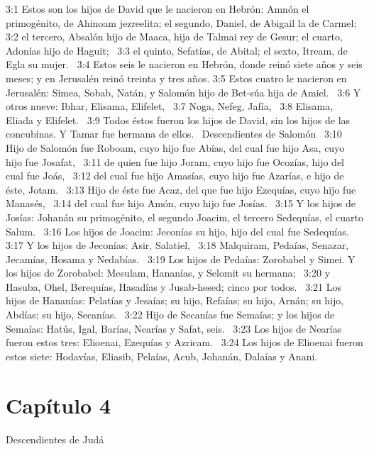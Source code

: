 3:1 Estos son los hijos de David que le nacieron en Hebrón: Amnón el primogénito, de Ahinoam jezreelita; el segundo, Daniel, de Abigail la de Carmel;  
3:2 el tercero, Absalón hijo de Maaca, hija de Talmai rey de Gesur; el cuarto, Adonías hijo de Haguit;  
3:3 el quinto, Sefatías, de Abital; el sexto, Itream, de Egla su mujer.  
3:4 Estos seis le nacieron en Hebrón, donde reinó siete años y seis meses; y en Jerusalén reinó treinta y tres años. 
3:5 Estos cuatro le nacieron en Jerusalén: Simea, Sobab, Natán, y Salomón hijo de Bet-súa hija de Amiel.  
3:6 Y otros nueve: Ibhar, Elisama, Elifelet,  
3:7 Noga, Nefeg, Jafía,  
3:8 Elisama, Eliada y Elifelet.  
3:9 Todos éstos fueron los hijos de David, sin los hijos de las concubinas. Y Tamar fue hermana de ellos.  
Descendientes de Salomón  
3:10 Hijo de Salomón fue Roboam, cuyo hijo fue Abías, del cual fue hijo Asa, cuyo hijo fue Josafat,  
3:11 de quien fue hijo Joram, cuyo hijo fue Ocozías, hijo del cual fue Joás,  
3:12 del cual fue hijo Amasías, cuyo hijo fue Azarías, e hijo de éste, Jotam.  
3:13 Hijo de éste fue Acaz, del que fue hijo Ezequías, cuyo hijo fue Manasés,  
3:14 del cual fue hijo Amón, cuyo hijo fue Josías.  
3:15 Y los hijos de Josías: Johanán su primogénito, el segundo Joacim, el tercero Sedequías, el cuarto Salum.  
3:16 Los hijos de Joacim: Jeconías su hijo, hijo del cual fue Sedequías.  
3:17 Y los hijos de Jeconías: Asir, Salatiel,  
3:18 Malquiram, Pedaías, Senazar, Jecamías, Hosama y Nedabías.  
3:19 Los hijos de Pedaías: Zorobabel y Simei. Y los hijos de Zorobabel: Mesulam, Hananías, y Selomit su hermana;  
3:20 y Hasuba, Ohel, Berequías, Hasadías y Jusab-hesed; cinco por todos.  
3:21 Los hijos de Hananías: Pelatías y Jesaías; su hijo, Refaías; su hijo, Arnán; su hijo, Abdías; su hijo, Secanías.  
3:22 Hijo de Secanías fue Semaías; y los hijos de Semaías: Hatús, Igal, Barías, Nearías y Safat, seis.  
3:23 Los hijos de Nearías fueron estos tres: Elioenai, Ezequías y Azricam.  
3:24 Los hijos de Elioenai fueron estos siete: Hodavías, Eliasib, Pelaías, Acub, Johanán, Dalaías y Anani.  
\section*{Capítulo 4}
Descendientes de Judá  

